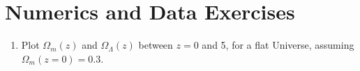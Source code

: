 \section{Numerics and Data Exercises}

\begin{enumerate}
\item Plot $\Omega_m(z)$ and $\Omega_\Lambda(z)$ between $z=0$ and 5,
for a flat Universe, assuming $\Omega_{m}(z=0)=0.3$.
\end{enumerate}


  
